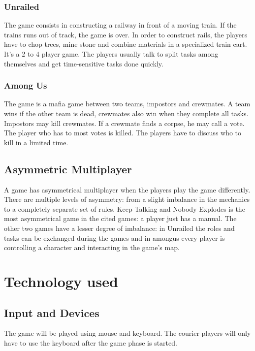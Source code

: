 \documentclass{article}
\begin{document}
\subsubsection{Unrailed}
The game consists in constructing a railway in front of a moving train. If the trains runs out of track, the game is over. In order to construct rails, the players have to chop trees, mine stone and combine materials in a specialized train cart. It's a 2 to 4 player game. The players  usually talk to split tasks among themselves and get time-sensitive tasks done quickly.
\subsubsection{Among Us}
The game is a mafia game between two teams, impostors and crewmates. A team wins if the other team is dead, crewmates also win when they complete all tasks. Impostors may kill crewmates. If a crewmate finds a corpse, he may call a vote. The player who has to most votes is killed. The players have to discuss who to kill in a limited time.
\subsection{Asymmetric Multiplayer}
A game has asymmetrical multiplayer when the players play the game differently. There are multiple levels of asymmetry: from a slight imbalance in the mechanics to a completely separate set of rules. Keep Talking and Nobody Explodes is the most asymmetrical game in the cited games: a player just has a manual. The other two games have a lesser degree of imbalance: in Unrailed the roles and tasks can be exchanged during the games and in amongus every player is controlling a character and interacting in the game's map.

\clearpage

\section{Technology used}

\subsection{Input and Devices}
The game will be played using mouse and keyboard. The courier players will only have to use the keyboard after the game phase is started.
\end{document}
